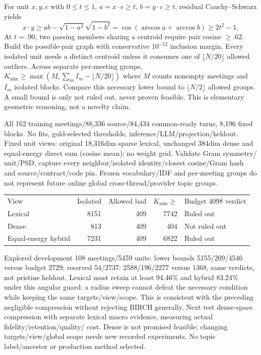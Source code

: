 \documentclass[11pt]{article}
\begin{document}
For unit $x,y,c$ with $0\le t\le1$, $a=x\cdot c\ge t$, $b=y\cdot c\ge t$, residual
Cauchy--Schwarz yields
\[
x\cdot y\ge ab-\sqrt{1-a^2}\sqrt{1-b^2}
=\cos(\arccos a+\arccos b)\ge 2t^2-1.
\]
At $t=.90$, two passing members sharing a centroid require pair cosine $\ge.62$.
Build the possible-pair graph with conservative $10^{-12}$ inclusion margin.
Every isolated unit needs a distinct centroid unless it consumes one of
$\lfloor N/20\rfloor$ allowed outliers. Across separate per-meeting groups,
$K_{\min}\ge\max(M,\sum_m I_m-\lfloor N/20\rfloor)$ where $M$ counts nonempty
meetings and $I_m$ isolated blocks. Compare this necessary lower bound to
$\lfloor N/2\rfloor$ allowed groups. A small bound is only not ruled out, never
proven feasible. This is elementary geometric reasoning, not a novelty claim.

All 162 training meetings/88,336 source/84,434 common-ready turns, 8,196 fixed
blocks. No fits, gold-selected thresholds, inference/LLM/projection/heldout.
Fixed unit views: original 18,316dim sparse lexical, unchanged 384dim dense and
equal-energy direct sum (cosine mean); no weight grid. Validate Gram symmetry/
unit/PSD, capture every neighbor/isolated identity/closest cosine/Gram hash and
source/contract/code pin. Frozen vocabulary/IDF and per-meeting groups do not
represent future online global cross-thread/provider topic groups.

\begin{center}\begin{tabular}{lrrrl}
View & Isolated & Allowed bad & $K_{\min}\ge$ & Budget 4098 verdict \\
Lexical & 8151 & 409 & 7742 & Ruled out \\
Dense & 813 & 409 & 404 & Not ruled out \\
Equal-energy hybrid & 7231 & 409 & 6822 & Ruled out
\end{tabular}\end{center}

Explored development 108 meetings/5459 units: lower bounds 5155/209/4546 versus
budget 2729; reserved 54/2737: 2588/196/2277 versus 1368, same verdicts, not pristine
heldout. Lexical must retain at least 94.46\% and hybrid 83.24\% under this angular
guard: a radius sweep cannot defeat the necessary condition while keeping the
same targets/view/scope. This is consistent with the preceding negligible compression
without rejecting BIRCH generally. Next test dense-space compression with
separate lexical macro evidence, measuring actual fidelity/retention/quality/
cost. Dense is not promised feasible; changing targets/view/global scope needs
new recorded experiments. No topic label/ancestor or production method selected.
\end{document}

